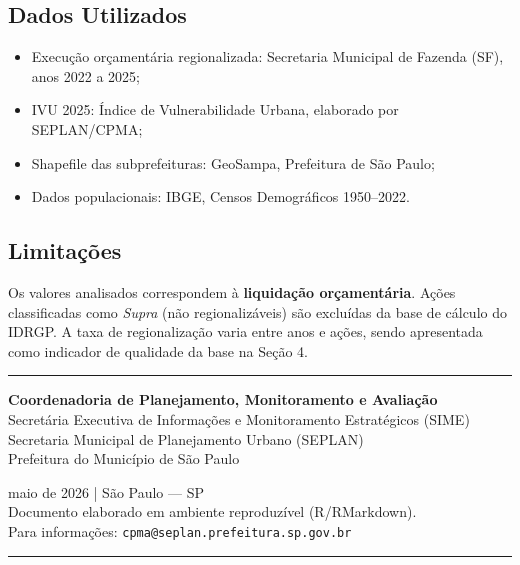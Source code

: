 \documentclass[
  brazilian,
  12pt,
]{article}
\providecommand{\tightlist}{%
  \setlength{\itemsep}{0pt}\setlength{\parskip}{0pt}}
\begin{document}
\subsection{Dados Utilizados}\label{dados-utilizados}

\begin{itemize}
\tightlist
\item
  Execução orçamentária regionalizada: Secretaria Municipal de Fazenda
  (SF), anos 2022 a 2025;
\item
  IVU 2025: Índice de Vulnerabilidade Urbana, elaborado por SEPLAN/CPMA;
\item
  Shapefile das subprefeituras: GeoSampa, Prefeitura de São Paulo;
\item
  Dados populacionais: IBGE, Censos Demográficos 1950--2022.
\end{itemize}

\subsection{Limitações}\label{limitauxe7uxf5es}

Os valores analisados correspondem à \textbf{liquidação orçamentária}.
Ações classificadas como \emph{Supra} (não regionalizáveis) são
excluídas da base de cálculo do IDRGP. A taxa de regionalização varia
entre anos e ações, sendo apresentada como indicador de qualidade da
base na Seção 4.

\newpage

\thispagestyle{empty}

\vspace*{\fill}

\begin{center}

\textcolor{pmsp}{\rule{10cm}{1.5pt}}

\vspace{0.8cm}

{\large \textbf{Coordenadoria de Planejamento, Monitoramento e Avaliação}}\\[0.2cm]
{\normalsize Secretária Executiva de Informações e Monitoramento Estratégicos (SIME)}\\[0.1cm]
{\normalsize Secretaria Municipal de Planejamento Urbano (SEPLAN)}\\[0.1cm]
{\normalsize Prefeitura do Município de São Paulo}

\vspace{0.6cm}

{\small maio de 2026 | São Paulo — SP}\\[0.2cm]
{\small Documento elaborado em ambiente reproduzível (R/RMarkdown).}\\[0.1cm]
{\small Para informações: \texttt{cpma@seplan.prefeitura.sp.gov.br}}

\vspace{0.8cm}

\textcolor{pmsp}{\rule{10cm}{1.5pt}}

\end{center}

\vspace*{\fill}
\end{document}
